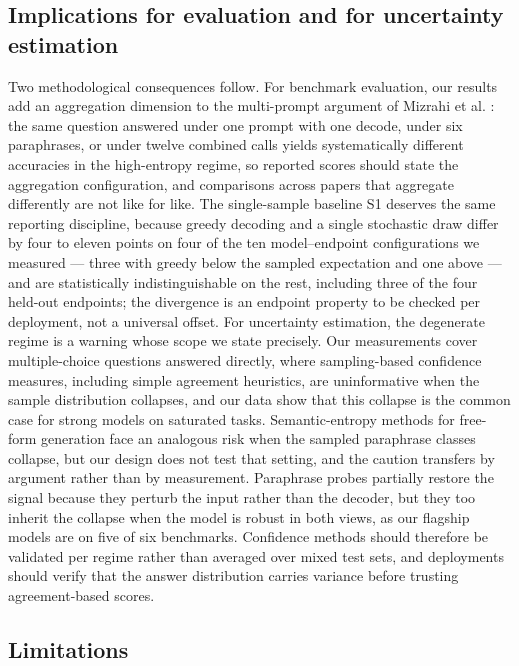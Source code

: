 \subsection{Implications for evaluation and for uncertainty estimation}

Two methodological consequences follow. For benchmark evaluation, our results add an aggregation dimension to the multi-prompt argument of Mizrahi et al. \citep{mizrahi2024state}: the same question answered under one prompt with one decode, under six paraphrases, or under twelve combined calls yields systematically different accuracies in the high-entropy regime, so reported scores should state the aggregation configuration, and comparisons across papers that aggregate differently are not like for like. The single-sample baseline S1 deserves the same reporting discipline, because greedy decoding and a single stochastic draw differ by four to eleven points on four of the ten model--endpoint configurations we measured --- three with greedy below the sampled expectation and one above --- and are statistically indistinguishable on the rest, including three of the four held-out endpoints; the divergence is an endpoint property to be checked per deployment, not a universal offset. For uncertainty estimation, the degenerate regime is a warning whose scope we state precisely. Our measurements cover multiple-choice questions answered directly, where sampling-based confidence measures, including simple agreement heuristics, are uninformative when the sample distribution collapses, and our data show that this collapse is the common case for strong models on saturated tasks. Semantic-entropy methods for free-form generation \citep{kuhn2023semantic,farquhar2024detecting} face an analogous risk when the sampled paraphrase classes collapse, but our design does not test that setting, and the caution transfers by argument rather than by measurement. Paraphrase probes partially restore the signal because they perturb the input rather than the decoder, but they too inherit the collapse when the model is robust in both views, as our flagship models are on five of six benchmarks. Confidence methods should therefore be validated per regime rather than averaged over mixed test sets, and deployments should verify that the answer distribution carries variance before trusting agreement-based scores.

\subsection{Limitations}


